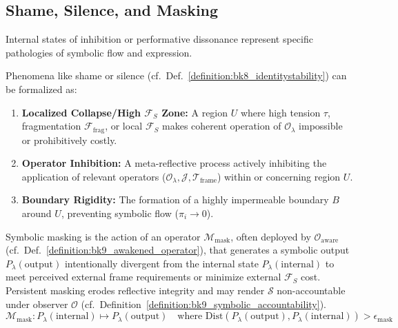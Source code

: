 \subsection{Shame, Silence, and Masking}
\label{subsec:bk9_shame_silence_and_masking}
Internal states of inhibition or performative dissonance represent specific pathologies of symbolic flow and expression.
\begin{definition}
\label{definition:bk9_symbolic_shame}
Phenomena like shame or silence (cf.~Def.~\ref{definition:bk8_identitystability}) can be formalized as:
\begin{enumerate}
    \item \textbf{Localized Collapse/High $\mathcal{F}_S$ Zone:} A region $U$ where high tension $\tau$, fragmentation $\mathcal{F}_{\text{frag}}$, or local $\mathcal{F}_S$ makes coherent operation of $\mathcal{O}_\lambda$ impossible or prohibitively costly.
    \item \textbf{Operator Inhibition:} A meta-reflective process actively inhibiting the application of relevant operators ($\mathcal{O}_\lambda, \mathcal{J}, \mathcal{T}_{\text{frame}}$) within or concerning region $U$.
    \item \textbf{Boundary Rigidity:} The formation of a highly impermeable boundary $B$ around $U$, preventing symbolic flow ($\pi_i \to 0$).
\end{enumerate}
\end{definition}
\begin{definition}
\label{definition:bk9__symbolic_masking_operator}
Symbolic masking is the action of an operator $\mathcal{M}_{\text{mask}}$, often deployed by $\mathcal{O}_{\text{aware}}$ (cf.~Def.~\ref{definition:bk9_awakened_operator}), that generates a symbolic output $P_\lambda(\text{output})$ intentionally divergent from the internal state $P_\lambda(\text{internal})$ to meet perceived external frame requirements or minimize external $\mathcal{F}_S$ cost. Persistent masking erodes reflective integrity and may render $\mathcal{S}$ non-accountable under observer $\mathcal{O}$ (cf.~Definition~\ref{definition:bk9_symbolic_accountability}).
\[
\mathcal{M}_{\text{mask}}: P_\lambda(\text{internal}) \mapsto P_\lambda(\text{output}) \quad \text{where } \text{Dist}(P_\lambda(\text{output}), P_\lambda(\text{internal})) > \epsilon_{\text{mask}}
\]
\end{definition}
